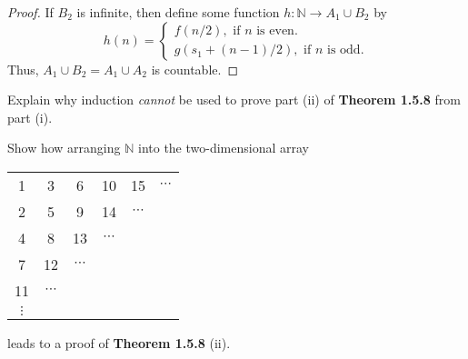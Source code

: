 \documentclass[12pt]{article}
\newcommand{\N}{\mathbb{N}}
\newenvironment{problem}[2][Problem]{\begin{trivlist}
		\item[\hskip \labelsep {\bfseries #1}\hskip \labelsep {\bfseries #2.}]}{\end{trivlist}}
\newenvironment{solution}[2][Solution]{\begin{trivlist}
		\item[\hskip \labelsep {\bfseries #1}\hskip \labelsep {\bfseries #2.}]}{\end{trivlist}}
\begin{document}
\begin{problem}{1.5.3}
\begin{enumerate}[label=(\alph*)]
\begin{solution}{(a)}
\begin{proof}
				If $B_{2}$ is infinite, then define some function $h:\N \to A_{1}\cup B_{2}$ by
					\begin{equation*}
						h(n) = \begin{cases}
							f(n/2), \text{ if }n \text{ is even}.\\
							g(s_{1} + (n-1)/2), \text{ if }n \text{ is odd}.
						\end{cases}
					\end{equation*}
				Thus, $A_{1}\cup B_{2} = A_{1}\cup A_{2}$ is countable. 
				\end{proof}
			\end{solution}
			\item Explain why induction \textit{cannot} be used to prove part (ii) of \textbf{Theorem 1.5.8} from part (i).
			\item Show how arranging $\N$ into the two-dimensional array
			\begin{center}
			\begin{tabular}{c c c c c c}
				1 & 3 & 6 & 10 & 15 & $\cdots$\\
				2 & 5 & 9 & 14 & $\cdots$&\\
				4 & 8 & 13 & $\cdots$ & & \\
				7 & 12 & $\cdots$ & & & \\
				11 & $\cdots$ & & & &\\
				$\vdots$ & & & & &
			\end{tabular}
			\end{center}
			leads to a proof of \textbf{Theorem 1.5.8} (ii).
		\end{enumerate}
	\end{problem}
\end{document}
